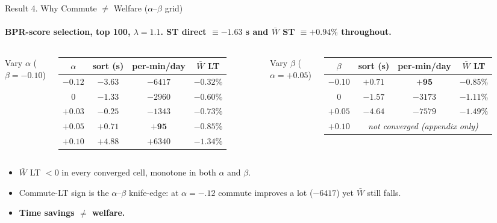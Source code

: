 \documentclass[11pt,aspectratio=169]{beamer}
\newcommand{\good}[1]{\textcolor{blue!70!black}{#1}}
\newcommand{\bad}[1]{\textcolor{red!70!black}{#1}}
\newcommand{\app}[1]{\hyperlink{#1}{\beamergotobutton{details}}}
\begin{document}
\begin{frame}{Result 4. Why Commute $\neq$ Welfare ($\alpha$--$\beta$ grid)}
\framesubtitle{BPR-score selection, top 100, $\lambda=1.1$. ST direct $\equiv-1.63$ s and $\bar W$ ST $\equiv+0.94\%$ throughout.}
\begin{columns}[T,onlytextwidth]
\centering Vary $\alpha$ ($\beta=-0.10$)\\[2pt]
\scriptsize
\begin{tabular}{cccc}
\toprule
$\alpha$ & sort (s) & per-min/day & $\bar W$ LT \\
\midrule
$-0.12$ & $-3.63$ & $-6417$ & $-0.32\%$ \\
$0$     & $-1.33$ & $-2960$ & $-0.60\%$ \\
$+0.03$ & $-0.25$ & $-1343$ & $-0.73\%$ \\
$\mathbf{+0.05}$ & $\mathbf{+0.71}$ & $\mathbf{+95}$ & $\mathbf{-0.85\%}$ \\
$+0.10$ & $+4.88$ & $+6340$ & $-1.34\%$ \\
\bottomrule
\end{tabular}
\centering Vary $\beta$ ($\alpha=+0.05$)\\[2pt]
\scriptsize
\begin{tabular}{cccc}
\toprule
$\beta$ & sort (s) & per-min/day & $\bar W$ LT \\
\midrule
$\mathbf{-0.10}$ & $\mathbf{+0.71}$ & $\mathbf{+95}$ & $\mathbf{-0.85\%}$ \\
$0$     & $-1.57$ & $-3173$ & $-1.11\%$ \\
$+0.05$ & $-4.64$ & $-7579$ & $-1.49\%$ \\
$+0.10$ & \multicolumn{3}{c}{\emph{not converged (appendix only)}} \\
\bottomrule
\end{tabular}
\end{columns}
\vspace{0.4em}
\begin{itemize}\footnotesize
  \item \bad{$\bar W$ LT $<0$ in every converged cell}, monotone in both $\alpha$ and $\beta$.
  \item Commute-LT sign is the \good{$\alpha$--$\beta$ knife-edge}: at $\alpha{=}{-}.12$ commute improves a lot ($-6417$) yet $\bar W$ still falls.
  \item \textbf{Time savings $\neq$ welfare.} \app{appgrid}\;\app{appgridext}
\end{itemize}
\end{frame}
\end{document}
